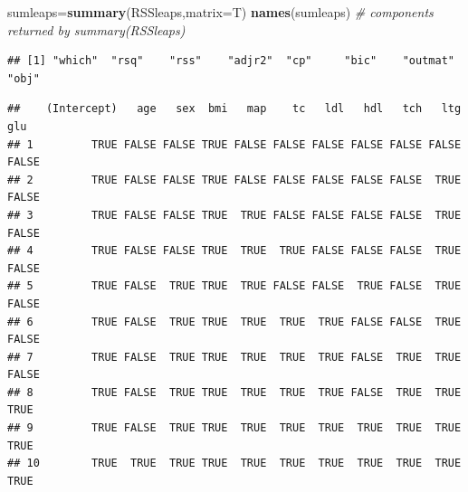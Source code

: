 \documentclass[
]{book}
\newenvironment{Shaded}{\begin{snugshade}}{\end{snugshade}}
\newcommand{\CommentTok}[1]{\textcolor[rgb]{0.56,0.35,0.01}{\textit{#1}}}
\newcommand{\DataTypeTok}[1]{\textcolor[rgb]{0.13,0.29,0.53}{#1}}
\newcommand{\KeywordTok}[1]{\textcolor[rgb]{0.13,0.29,0.53}{\textbf{#1}}}
\newcommand{\NormalTok}[1]{#1}
\newcommand{\OperatorTok}[1]{\textcolor[rgb]{0.81,0.36,0.00}{\textbf{#1}}}
\begin{document}
\begin{Shaded}
\begin{Highlighting}[]
\NormalTok{    sumleaps=}\KeywordTok{summary}\NormalTok{(RSSleaps,}\DataTypeTok{matrix=}\NormalTok{T)}
    \KeywordTok{names}\NormalTok{(sumleaps)  }\CommentTok{# components returned by summary(RSSleaps)}
\end{Highlighting}
\end{Shaded}

\begin{verbatim}
## [1] "which"  "rsq"    "rss"    "adjr2"  "cp"     "bic"    "outmat" "obj"
\end{verbatim}

\begin{Shaded}
\end{Shaded}

\begin{verbatim}
##    (Intercept)   age   sex  bmi   map    tc   ldl   hdl   tch   ltg   glu
## 1         TRUE FALSE FALSE TRUE FALSE FALSE FALSE FALSE FALSE FALSE FALSE
## 2         TRUE FALSE FALSE TRUE FALSE FALSE FALSE FALSE FALSE  TRUE FALSE
## 3         TRUE FALSE FALSE TRUE  TRUE FALSE FALSE FALSE FALSE  TRUE FALSE
## 4         TRUE FALSE FALSE TRUE  TRUE  TRUE FALSE FALSE FALSE  TRUE FALSE
## 5         TRUE FALSE  TRUE TRUE  TRUE FALSE FALSE  TRUE FALSE  TRUE FALSE
## 6         TRUE FALSE  TRUE TRUE  TRUE  TRUE  TRUE FALSE FALSE  TRUE FALSE
## 7         TRUE FALSE  TRUE TRUE  TRUE  TRUE  TRUE FALSE  TRUE  TRUE FALSE
## 8         TRUE FALSE  TRUE TRUE  TRUE  TRUE  TRUE FALSE  TRUE  TRUE  TRUE
## 9         TRUE FALSE  TRUE TRUE  TRUE  TRUE  TRUE  TRUE  TRUE  TRUE  TRUE
## 10        TRUE  TRUE  TRUE TRUE  TRUE  TRUE  TRUE  TRUE  TRUE  TRUE  TRUE
\end{verbatim}
\end{document}

